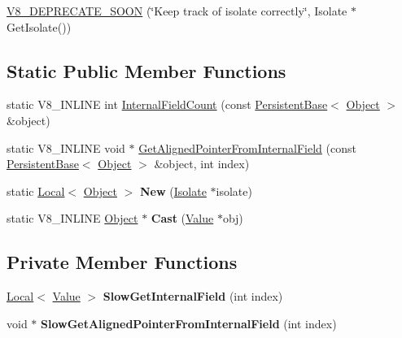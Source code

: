 \begin{DoxyCompactItemize}
\item 
\hyperlink{classv8_1_1_object_a5e7199a517d980396bb86f876b5bae0a}{V8\+\_\+\+D\+E\+P\+R\+E\+C\+A\+T\+E\+\_\+\+S\+O\+ON} (\char`\"{}Keep track of isolate correctly\char`\"{}, Isolate $\ast$Get\+Isolate())
\end{DoxyCompactItemize}
\subsection*{Static Public Member Functions}
\begin{DoxyCompactItemize}
\item 
static V8\+\_\+\+I\+N\+L\+I\+NE int \hyperlink{classv8_1_1_object_a324a71142f621a32bfe5738648718370}{Internal\+Field\+Count} (const \hyperlink{classv8_1_1_persistent_base}{Persistent\+Base}$<$ \hyperlink{classv8_1_1_object}{Object} $>$ \&object)
\item 
static V8\+\_\+\+I\+N\+L\+I\+NE void $\ast$ \hyperlink{classv8_1_1_object_a65b5a3dc93c0774594f8b0f2ab5481c8}{Get\+Aligned\+Pointer\+From\+Internal\+Field} (const \hyperlink{classv8_1_1_persistent_base}{Persistent\+Base}$<$ \hyperlink{classv8_1_1_object}{Object} $>$ \&object, int index)
\item 
static \hyperlink{classv8_1_1_local}{Local}$<$ \hyperlink{classv8_1_1_object}{Object} $>$ {\bfseries New} (\hyperlink{classv8_1_1_isolate}{Isolate} $\ast$isolate)\hypertarget{classv8_1_1_object_a0c397b055e2f5050c6ffc33970669c4d}{}\label{classv8_1_1_object_a0c397b055e2f5050c6ffc33970669c4d}

\item 
static V8\+\_\+\+I\+N\+L\+I\+NE \hyperlink{classv8_1_1_object}{Object} $\ast$ {\bfseries Cast} (\hyperlink{classv8_1_1_value}{Value} $\ast$obj)\hypertarget{classv8_1_1_object_a1f9ac46d0b164197318ce81dc0ec1343}{}\label{classv8_1_1_object_a1f9ac46d0b164197318ce81dc0ec1343}

\end{DoxyCompactItemize}
\subsection*{Private Member Functions}
\begin{DoxyCompactItemize}
\item 
\hyperlink{classv8_1_1_local}{Local}$<$ \hyperlink{classv8_1_1_value}{Value} $>$ {\bfseries Slow\+Get\+Internal\+Field} (int index)\hypertarget{classv8_1_1_object_a18ac08535872a4900c34c96c2f479ef5}{}\label{classv8_1_1_object_a18ac08535872a4900c34c96c2f479ef5}

\item 
void $\ast$ {\bfseries Slow\+Get\+Aligned\+Pointer\+From\+Internal\+Field} (int index)\hypertarget{classv8_1_1_object_a254bb7ff6feedb99dee30ac3a3a112af}{}\label{classv8_1_1_object_a254bb7ff6feedb99dee30ac3a3a112af}

\end{DoxyCompactItemize}

